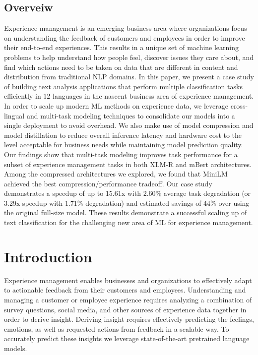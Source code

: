 \subsection{Overveiw}
Experience management is an emerging business area where organizations focus on understanding the feedback of customers and employees in order to improve their end-to-end experiences.
This results in a unique set of machine learning problems to help understand how people feel, discover issues they care about, and find which actions need to be taken on data that are different in content and distribution from traditional NLP domains.
In this paper, we present a case study of building text analysis applications that perform multiple classification tasks efficiently in 12 languages in the nascent business area of experience management.
In order to scale up modern ML methods on experience data, we leverage cross-lingual and multi-task modeling techniques to consolidate our models into a single deployment to avoid overhead.
We also make use of model compression and model distillation to reduce overall inference latency and hardware cost to the level acceptable for business needs while maintaining model prediction quality.
Our findings show that multi-task modeling improves task performance for a subset of experience management tasks in both XLM-R and mBert architectures.
Among the compressed architectures we explored, we found that MiniLM achieved the best compression/performance tradeoff.
Our case study demonstrates a speedup of up to 15.61x with 2.60\% average task degradation (or 3.29x speedup with 1.71\% degradation) and estimated savings of 44\% over using the original full-size model.
These results demonstrate a successful scaling up of text classification for the challenging new area of ML for experience management.
\section*{Introduction}
Experience management enables businesses and organizations to effectively adapt to actionable feedback from their customers and employees.
Understanding and managing a customer or employee experience requires analyzing a combination of survey questions, social media, and other sources of experience data together in order to derive insight.
Deriving insight requires effectively predicting the feelings, emotions, as well as requested actions from feedback in a scalable way.
To accurately predict these insights we leverage state-of-the-art pretrained language models.


